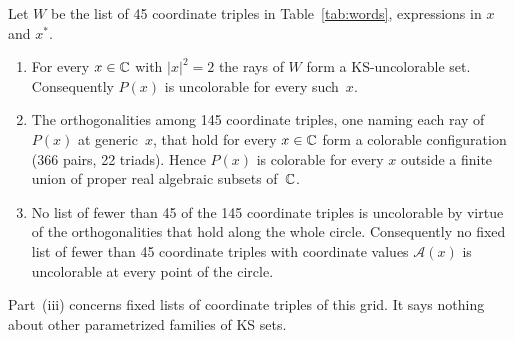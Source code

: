 \begin{theorem}\label{thm:circle}
Let $W$ be the list of 45 coordinate triples in Table~\ref{tab:words}, expressions in $x$ and $x^{*}$.
\begin{enumerate}
\item[(i)] For every $x\in\mathbb{C}$ with $|x|^2=2$ the rays of $W$ form a KS-uncolorable set.
Consequently $P(x)$ is uncolorable for every such~$x$.
\item[(ii)] The orthogonalities among 145 coordinate triples, one naming each ray of $P(x)$ at generic~$x$, that hold for every
$x\in\mathbb{C}$ form a colorable
configuration (366 pairs, 22 triads).  Hence $P(x)$ is colorable for every $x$ outside a finite
union of proper real algebraic subsets of~$\mathbb{C}$.
\item[(iii)] No list of fewer than 45 of the 145 coordinate triples is uncolorable by virtue of the
orthogonalities that hold along the whole circle.  Consequently no fixed list of fewer than 45
coordinate triples with coordinate values $\mathcal A(x)$ is uncolorable at every point of the circle.
\end{enumerate}
Part~(iii) concerns fixed lists of coordinate triples of this grid.  It says nothing about other
parametrized families of KS sets.
\end{theorem}

